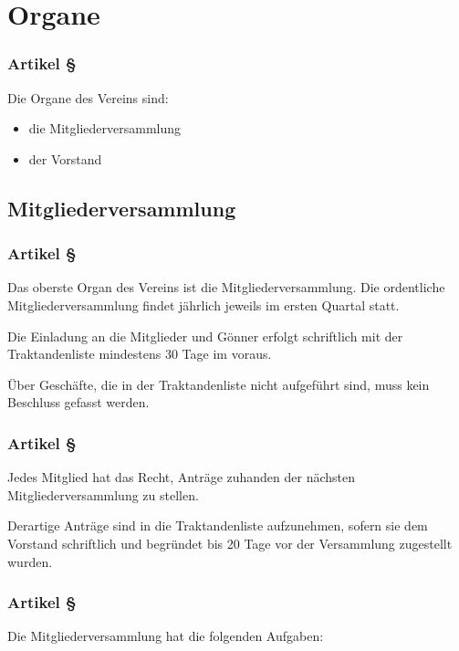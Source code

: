 \section{Organe}

\subsubsection*{Artikel §\articlenumber}
Die Organe des Vereins sind:

\begin{itemize}
	\item die Mitgliederversammlung
	\item der Vorstand
\end{itemize}

\subsection{Mitgliederversammlung}

\subsubsection*{Artikel §\articlenumber}
Das oberste Organ des Vereins ist die Mitgliederversammlung. Die ordentliche
Mitgliederversammlung findet jährlich jeweils im ersten Quartal statt.

Die Einladung an die Mitglieder und Gönner erfolgt schriftlich mit der
Traktandenliste mindestens 30 Tage im voraus.

Über Geschäfte, die in der Traktandenliste nicht aufgeführt sind, muss kein
Beschluss gefasst werden.

\subsubsection*{Artikel §\articlenumber}
Jedes Mitglied hat das Recht, Anträge zuhanden der nächsten
Mitgliederversammlung zu stellen.

Derartige Anträge sind in die Traktandenliste aufzunehmen, sofern sie dem
Vorstand schriftlich und begründet bis 20 Tage vor der Versammlung zugestellt
wurden.

\newpage
\subsubsection*{Artikel §\articlenumber}
Die Mitgliederversammlung hat die folgenden Aufgaben:


